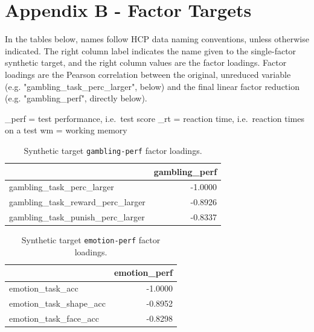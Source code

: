 \documentclass{article}
\begin{document}
\section{Appendix B - Factor Targets} \label{sec:appendix-b}


%



In the tables below, names follow HCP data naming conventions, unless otherwise
indicated. The right column label indicates the name given to the single-factor
synthetic target, and the right column values are the factor loadings. Factor
loadings are the Pearson correlation between the original, unreduced variable
(e.g. "gambling\_task\_perc\_larger", below) and the final linear factor reduction
(e.g. "gambling\_perf", directly below).

\_perf = test performance, i.e.\ test score
\_rt = reaction time, i.e.\ reaction times on a test
wm = working memory

\begin{table}[H]
\caption{Synthetic target \texttt{gambling-perf} factor loadings.}\label{tab:gambling-perf}
\centering
\begin{tabular}{lr}
\toprule
 & gambling\_perf \\
\midrule
gambling\_task\_perc\_larger & -1.0000 \\
gambling\_task\_reward\_perc\_larger & -0.8926 \\
gambling\_task\_punish\_perc\_larger & -0.8337 \\
\bottomrule
\end{tabular}

\end{table}


\begin{table}[H]
\caption{Synthetic target \texttt{emotion-perf} factor loadings.}\label{tab:emotion-perf}
\centering
\begin{tabular}{lr}
\toprule
 & emotion\_perf \\
\midrule
emotion\_task\_acc & -1.0000 \\
emotion\_task\_shape\_acc & -0.8952 \\
emotion\_task\_face\_acc & -0.8298 \\
\bottomrule
\end{tabular}

\end{table}
\end{document}
